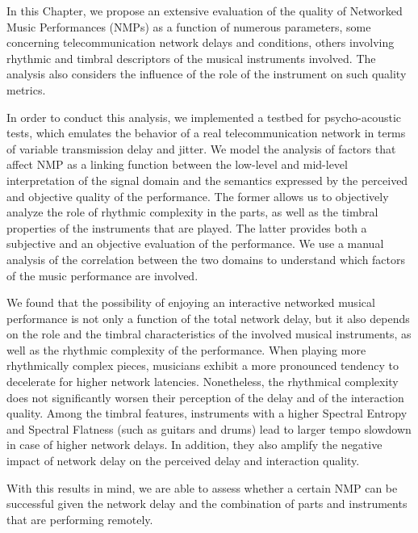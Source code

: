 In this Chapter, we propose an extensive evaluation of the quality of Networked Music Performances (NMPs) as a function of numerous parameters, some concerning telecommunication network delays and conditions, others involving rhythmic and timbral descriptors of the musical instruments involved. The analysis also considers the influence of the role of the instrument on such quality metrics.

In order to conduct this analysis, we implemented a testbed for psycho-acoustic tests, which emulates the behavior of a real telecommunication network in terms of variable transmission delay and jitter. %
We model the analysis of factors that affect NMP as a linking function between the low-level and mid-level interpretation of the signal domain and the semantics expressed by the perceived and objective quality of the performance. The former allows us to objectively analyze the role of rhythmic complexity in the parts, as well as the timbral properties of the instruments that are played. The latter provides both a subjective and an objective evaluation of the performance. We use a manual analysis of the correlation between the two domains to understand which factors of the music performance are involved.

We found that the possibility of enjoying an interactive networked musical performance is not only a function of the total network delay, but it also depends on the role and the timbral characteristics of the involved musical instruments, as well as the rhythmic complexity of the performance. When playing more rhythmically complex pieces, musicians exhibit a more pronounced tendency to decelerate for higher network latencies. Nonetheless, the rhythmical complexity does not significantly worsen their perception of the delay and of the interaction quality.
Among the timbral features, instruments with a higher Spectral Entropy and Spectral Flatness (such as guitars and drums) lead to larger tempo slowdown in case of higher network delays. In addition, they also amplify the negative impact of network delay on the perceived delay and interaction quality.

With this results in mind, we are able to assess whether a certain NMP can be successful given the network delay and the combination of parts and instruments that are performing remotely.

